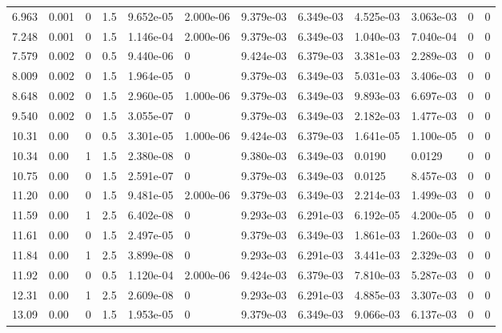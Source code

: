 \documentclass[preview]{standalone}
\begin{document}
{{\begin{tabular}{L{1.2cm}C{1.2cm} C{0.3cm}C{0.5cm} C{1.4cm}C{1.4cm} C{1.4cm}C{1.4cm} C{1.6cm}C{1.6cm} C{1.6cm}C{1.6cm}}
  6.963  &  0.001  & 0     & 1.5 &  9.652e-05  & 2.000e-06  &  9.379e-03&   6.349e-03& 4.525e-03 & 3.063e-03   &  0 & 0  \\ 
  7.248  &  0.001  & 0     & 1.5 &  1.146e-04  & 2.000e-06  &  9.379e-03&   6.349e-03& 1.040e-03 & 7.040e-04   &  0 & 0  \\ 
  7.579  &  0.002  & 0     & 0.5 &  9.440e-06  & 0  &  9.424e-03&   6.379e-03& 3.381e-03 & 2.289e-03   &  0 & 0  \\ 
  8.009  &  0.002  & 0     & 1.5 &  1.964e-05  & 0  &  9.379e-03&   6.349e-03& 5.031e-03 & 3.406e-03   &  0 & 0  \\ 
  8.648  &  0.002  & 0     & 1.5 &  2.960e-05  & 1.000e-06  &  9.379e-03&   6.349e-03& 9.893e-03 & 6.697e-03   &  0 & 0  \\ 
  9.540  &  0.002  & 0     & 1.5 &  3.055e-07  & 0  &  9.379e-03&   6.349e-03& 2.182e-03 & 1.477e-03   &  0 & 0  \\ 
  10.31  &  0.00  & 0     & 0.5 &  3.301e-05  & 1.000e-06  &  9.424e-03&   6.379e-03& 1.641e-05 & 1.100e-05   &  0 & 0  \\ 
  10.34  &  0.00  & 1     & 1.5 &  2.380e-08  & 0  &  9.380e-03&   6.349e-03& 0.0190 & 0.0129   &  0 & 0  \\ 
  10.75  &  0.00  & 0     & 1.5 &  2.591e-07  & 0  &  9.379e-03&   6.349e-03& 0.0125 & 8.457e-03   &  0 & 0  \\ 
  11.20  &  0.00  & 0     & 1.5 &  9.481e-05  & 2.000e-06  &  9.379e-03&   6.349e-03& 2.214e-03 & 1.499e-03   &  0 & 0  \\ 
  11.59  &  0.00  & 1     & 2.5 &  6.402e-08  & 0  &  9.293e-03&   6.291e-03& 6.192e-05 & 4.200e-05   &  0 & 0  \\ 
  11.61  &  0.00  & 0     & 1.5 &  2.497e-05  & 0  &  9.379e-03&   6.349e-03& 1.861e-03 & 1.260e-03   &  0 & 0  \\ 
  11.84  &  0.00  & 1     & 2.5 &  3.899e-08  & 0  &  9.293e-03&   6.291e-03& 3.441e-03 & 2.329e-03   &  0 & 0  \\ 
  11.92  &  0.00  & 0     & 0.5 &  1.120e-04  & 2.000e-06  &  9.424e-03&   6.379e-03& 7.810e-03 & 5.287e-03   &  0 & 0  \\ 
  12.31  &  0.00  & 1     & 2.5 &  2.609e-08  & 0  &  9.293e-03&   6.291e-03& 4.885e-03 & 3.307e-03   &  0 & 0  \\ 
  13.09  &  0.00  & 0     & 1.5 &  1.953e-05  & 0  &  9.379e-03&   6.349e-03& 9.066e-03 & 6.137e-03   &  0 & 0  \\ 
\hline 
\end{tabular} 

}}
\end{document}
